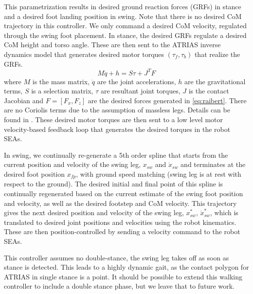 This parametrization results in desired ground reaction forces (GRFs) in stance and a desired foot landing position in swing. Note that there is no desired CoM trajectory in this controller. We only command a desired CoM velocity, regulated through the swing foot placement. In stance, the desired GRFs regulate a desired CoM height and torso angle. These are then sent to the ATRIAS inverse dynamics model that generates desired motor torques $(\tau_f, \tau_b)$ that realize the GRFs. 
\begin{equation}
    M \ddot{q} + h = S \tau + J^T F
\end{equation}
where $M$ is the mass matrix, $\ddot{q}$ are the joint accelerations, $h$ are the gravitational terms, $S$ is a selection matrix, $\tau$ are resultant joint torques, $J$ is the contact Jacobian and $F = [F_x, F_z]$ are the desired forces generated in \ref{eq:raibert}. There are no Coriolis terms due to the assumption of massless legs. Details can be found in \cite{wu2014highly}. These desired motor torques are then sent to a low level motor velocity-based feedback loop that generates the desired torques in the robot SEAs. %

In swing, we continually re-generate a 5th order spline that starts from the current position and velocity of the swing leg, $x_{sw}$ and $\dot{x}_{sw}$ and terminates at the desired foot position $x_{fp}$, with ground speed matching (swing leg is at rest with respect to the ground). The desired initial and final point of this spline is continually regenerated based on the current estimate of the swing foot position and velocity, as well as the desired footstep and CoM velocity. This trajectory gives the next desired position and velocity of the swing leg, $x_{sw}^*$, $\dot{x}_{sw}^*$, which is translated to desired joint positions and velocities using the robot kinematics. These are then position-controlled by sending a velocity command to the robot SEAs. %


This controller assumes no double-stance, the swing leg takes off as soon as stance is detected. This leads to a highly dynamic gait, as the contact polygon for ATRIAS in single stance is a point. It should be possible to extend this walking controller to include a double stance phase, but we leave that to future work. 

